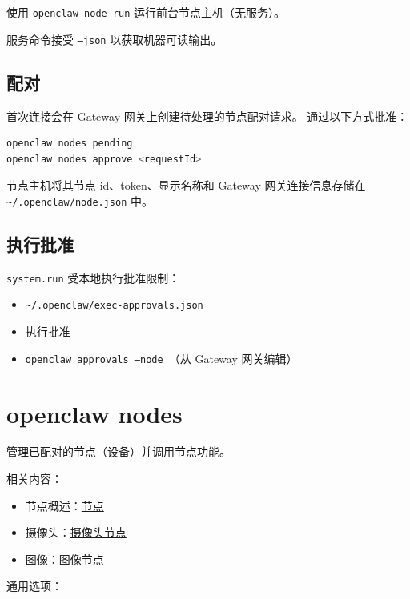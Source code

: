 使用 \texttt{openclaw node run} 运行前台节点主机（无服务）。

服务命令接受 \texttt{--json} 以获取机器可读输出。

\subsection{配对}


首次连接会在 Gateway 网关上创建待处理的节点配对请求。
通过以下方式批准：

\begin{lstlisting}[language=bash]
openclaw nodes pending
openclaw nodes approve <requestId>
\end{lstlisting}


节点主机将其节点 id、token、显示名称和 Gateway 网关连接信息存储在
\texttt{\textasciitilde{}/.openclaw/node.json} 中。

\subsection{执行批准}


\texttt{system.run} 受本地执行批准限制：

\begin{itemize}
  \item \texttt{\textasciitilde{}/.openclaw/exec-approvals.json}
  \item \href{/tools/exec-approvals}{执行批准}
  \item \texttt{openclaw approvals --node }（从 Gateway 网关编辑）
\end{itemize}



\clearpage

\section{openclaw nodes}


管理已配对的节点（设备）并调用节点功能。

相关内容：

\begin{itemize}
  \item 节点概述：\href{/nodes}{节点}
  \item 摄像头：\href{/nodes/camera}{摄像头节点}
  \item 图像：\href{/nodes/images}{图像节点}
\end{itemize}


通用选项：

